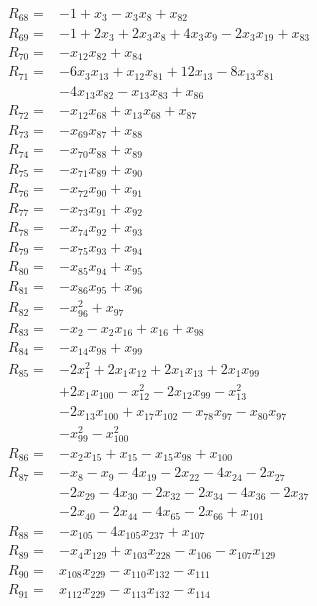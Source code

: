 \begin{align*}
R_{68}={}&-1 +x_{3} -x_{3}x_{8} +x_{82}\\[3pt]
R_{69}={}&-1 +2x_{3} +2x_{3}x_{8} +4x_{3}x_{9} -2x_{3}x_{19} +x_{83}\\[3pt]
R_{70}={}&-x_{12}x_{82} +x_{84}\\[3pt]
R_{71}={}&-6x_{3}x_{13} +x_{12}x_{81} +12x_{13} -8x_{13}x_{81}\\
&-4x_{13}x_{82} -x_{13}x_{83} +x_{86}\\[3pt]
R_{72}={}&-x_{12}x_{68} +x_{13}x_{68} +x_{87}\\[3pt]
R_{73}={}&-x_{69}x_{87} +x_{88}\\[3pt]
R_{74}={}&-x_{70}x_{88} +x_{89}\\[3pt]
R_{75}={}&-x_{71}x_{89} +x_{90}\\[3pt]
R_{76}={}&-x_{72}x_{90} +x_{91}\\[3pt]
R_{77}={}&-x_{73}x_{91} +x_{92}\\[3pt]
R_{78}={}&-x_{74}x_{92} +x_{93}\\[3pt]
R_{79}={}&-x_{75}x_{93} +x_{94}\\[3pt]
R_{80}={}&-x_{85}x_{94} +x_{95}\\[3pt]
R_{81}={}&-x_{86}x_{95} +x_{96}\\[3pt]
R_{82}={}&-x_{96}^{2} +x_{97}\\[3pt]
R_{83}={}&-x_{2} -x_{2}x_{16} +x_{16} +x_{98}\\[3pt]
R_{84}={}&-x_{14}x_{98} +x_{99}\\[3pt]
R_{85}={}&-2x_{1}^{2} +2x_{1}x_{12} +2x_{1}x_{13} +2x_{1}x_{99}\\
&+2x_{1}x_{100} -x_{12}^{2} -2x_{12}x_{99} -x_{13}^{2}\\
&-2x_{13}x_{100} +x_{17}x_{102} -x_{78}x_{97} -x_{80}x_{97}\\
&-x_{99}^{2} -x_{100}^{2}\\[3pt]
R_{86}={}&-x_{2}x_{15} +x_{15} -x_{15}x_{98} +x_{100}\\[3pt]
R_{87}={}&-x_{8} -x_{9} -4x_{19} -2x_{22} -4x_{24} -2x_{27}\\
&-2x_{29} -4x_{30} -2x_{32} -2x_{34} -4x_{36} -2x_{37}\\
&-2x_{40} -2x_{44} -4x_{65} -2x_{66} +x_{101}\\[3pt]
R_{88}={}&-x_{105} -4x_{105}x_{237} +x_{107}\\[3pt]
R_{89}={}&-x_{4}x_{129} +x_{103}x_{228} -x_{106} -x_{107}x_{129}\\[3pt]
R_{90}={}&x_{108}x_{229} -x_{110}x_{132} -x_{111}\\[3pt]
R_{91}={}&x_{112}x_{229} -x_{113}x_{132} -x_{114}\\[3pt]

\end{align*}
